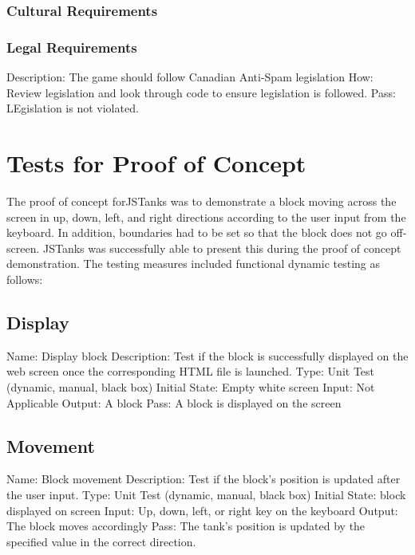 \documentclass{article}
\begin{document}
\subsubsection{Cultural Requirements}


\subsubsection{Legal Requirements}
 Description: The game should follow Canadian Anti-Spam legislation \newline
 How: Review legislation and look through code to ensure legislation is 
 followed. \newline
 Pass: LEgislation is not violated.



\section{Tests for Proof of Concept}
The proof of concept forJSTanks was to demonstrate a block moving across the 
screen in up, down, left, and right directions according to the user input 
from the keyboard. In addition, boundaries had to be set so that the block 
does not go off-screen. JSTanks was successfully able to present this during 
the proof of concept demonstration. The testing measures included functional 
dynamic testing as follows:
\subsection{Display}
Name: Display block\newline
Description: Test if the block is successfully displayed on the web screen 
once the corresponding HTML file is launched.\newline
Type: Unit Test (dynamic, manual, black box)\newline
Initial State: Empty white screen\newline
Input: Not Applicable\newline
Output: A block\newline
Pass: A block is displayed on the screen
\subsection{Movement}
Name: Block movement\newline
Description: Test if the block’s position is updated after the user input.
\newline
Type: Unit Test (dynamic, manual, black box)\newline
Initial State: block displayed on screen\newline
Input: Up, down, left, or right key on the keyboard\newline
Output: The block moves accordingly\newline
Pass: The tank’s position is updated by the specified value in the correct 
direction.
\end{document}
